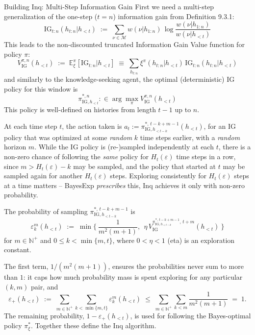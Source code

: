 \documentclass[aspectratio=169,10pt]{beamer}
\newcommand{\N}{\mathbb{N}}
\newcommand{\E}{\mathbb{E}}
\newcommand{\IG}{\mathrm{IG}}
\begin{document}
\begin{frame}[allowframebreaks]{Building Inq: Multi-Step Information Gain}
  First we need a multi-step generalization of the one-step ($t=n$)
  information gain from Definition 9.3.1:
  \[
    \IG_{t:n}(h_{t:n}|h_{<t}) \;:=\; \sum_{\nu\in\mathcal{M}} w(\nu|h_{1:n})\, \log\frac{w(\nu|h_{1:n})}{w(\nu|h_{<t})}
  \]
  This leads to the non-discounted truncated Information Gain Value
  function for policy $\pi$:
  \[
    V^{\pi,n}_{\IG}(h_{<t}) \;:=\; \E^\pi_\xi[\IG_{t:n}|h_{<t}] \;\equiv\; \sum_{h_{t:n}}\xi^\pi(h_{t:n}|h_{<t})\,\IG_{t:n}(h_{t:n}|h_{<t})
  \]
  and similarly to the knowledge-seeking agent, the optimal (deterministic)
  IG policy for this window is
  \[
    \pi^{*,n}_{\IG,h_{<t}} :\in \arg\max_\pi V^{\pi,n}_{\IG}(h_{<t})
  \]
  This policy is well-defined on histories from length $t-1$ up to $n$.

  \framebreak
  At each time step $t$, the action taken is
  $a_t := \pi^{*,\,t-k+m-1}_{\IG,h_{<t-k}}(h_{<t})$, for an IG policy that
  was optimized at some \emph{random} $k$ time steps earlier, with a
  \emph{random} horizon $m$. While the IG policy is (re-)sampled
  independently at each $t$, there is a non-zero chance of following the
  \emph{same} policy for $H_t(\varepsilon)$ time steps in a row, since
  $m>H_t(\varepsilon)-k$ may be sampled, and the policy that started at $t$
  may be sampled again for another $H_t(\varepsilon)$ steps. Exploring
  consistently for $H_t(\varepsilon)$ steps at a time matters -- BayesExp
  \emph{prescribes} this, Inq achieves it only with non-zero probability.

  The probability of sampling $\pi^{*,\,t-k+m-1}_{\IG,h_{<t-k}}$ is
  \[
    \varepsilon^m_k(h_{<t}) \;:=\; \min\Big\{\ \frac{1}{m^2(m+1)},\ \ \eta\, V^{\pi^{*,\,t-k+m-1}_{\IG,h_{<t-k}},\,t+m}_{\IG}(h_{<t})\ \Big\}
  \]
  for $m\in\N^+$ and $0\le k<\min\{m,t\}$, where $0<\eta<1$ (eta) is an
  exploration constant.

  \framebreak
  The first term, $1/(m^2(m+1))$, ensures the probabilities never sum to
  more than $1$: it caps how much probability mass is spent exploring for
  any particular $(k,m)$ pair, and
  \[
    \varepsilon_+(h_{<t}) \;:=\; \sum_{m\in\N^+}\sum_{k<\min\{m,t\}} \varepsilon^m_k(h_{<t}) \;\le\; \sum_{m\in\N^+}\sum_{k<m} \frac{1}{m^2(m+1)} \;=\; 1.
  \]
  The remaining probability, $1-\varepsilon_+(h_{<t})$, is used for
  following the Bayes-optimal policy $\pi^*_\xi$. Together these define
  the Inq algorithm.
\end{frame}
\end{document}
